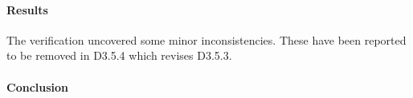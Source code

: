 \paragraph{Results}
The verification uncovered some minor inconsistencies. These have been
reported to be removed in D3.5.4 which revises D3.5.3. 


\paragraph{Conclusion}
